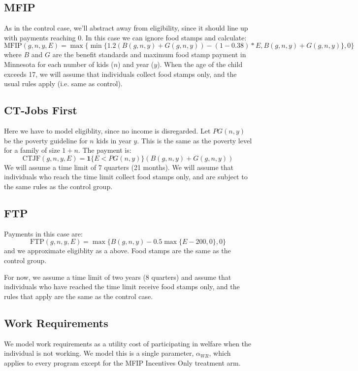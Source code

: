 \documentclass[12pt]{article}
\numberwithin{equation}{section}
\numberwithin{figure}{section}
\numberwithin{table}{section}
\begin{document}
\subsection{MFIP}
As in the control case, we'll abstract away from eligibility, since it should line up with payments reaching 0. In this case we can ignore food stamps and calculate:
\[\text{MFIP}(g,n,y,E) = \max\{\min\{1.2(B(g,n,y)+G(g,n,y)) - (1-0.38)*E,B(g,n,y)+G(g,n,y)\},0\} \]
where $B$ and $G$ are the benefit standards and maximum food stamp payment in Minnesota for each number of kids ($n$) and year ($y$). When the age of the child exceeds 17, we will assume that individuals collect food stamps only, and the usual rules apply (i.e. same as control).

\subsection{CT-Jobs First}
Here we have to model eligiblity, since no income is disregarded. Let $PG(n,y)$ be the poverty guideline for $n$ kids in year $y$. This is the same as the poverty level for a family of size $1+n$. The payment is:
\[\text{CTJF}(g,n,y,E) = \mathbf{1}\{E<PG(n,y)\}(B(g,n,y)+G(g,n,y)) \]
We will assume a time limit of 7 quarters (21 months). We will assume that individuals who reach the time limit collect food stamps only, and are subject to the same rules as the control group.

\subsection{FTP}
Payments in this case are:
\[\text{FTP}(g,n,y,E) = \max\{B(g,n,y) - 0.5\max\{E-200,0\},0\} \]
and we approximate eligiblity as a above. Food stamps are the same as the control group.

For now, we assume a time limit of two years (8 quarters) and assume that individuals who have reached the time limit receive food stamps only, and the rules that apply are the same as the control case.

\subsection{Work Requirements}
We model work requirements as a utility cost of participating in welfare when the individual is not working. We model this is a single parameter, $\alpha_{WR}$, which applies to every program except for the MFIP Incentives Only treatment arm.

%


\end{document}
